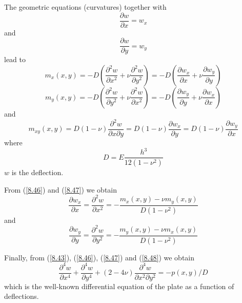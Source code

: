 The geometric equations (curvatures) together with
\begin{equation}
\frac{\partial w}{\partial x} = w_x
\label{8.44}
\end{equation}
and
\begin{equation}
\frac{\partial w}{\partial y} = w_y
\label{8.45}
\end{equation}
lead to
\begin{equation}
m_x(x,y) = -D\left(\frac{\partial^2 w}{\partial x^2} + \nu\frac{\partial^2 w}{\partial y^2}\right) = -D\left(\frac{\partial w_x}{\partial x} + \nu\frac{\partial w_y}{\partial y}\right)
\label{8.46}
\end{equation}
\begin{equation}
m_y(x,y) = -D\left(\frac{\partial^2 w}{\partial y^2} + \nu\frac{\partial^2 w}{\partial x^2}\right) = -D\left(\frac{\partial w_y}{\partial y} + \nu\frac{\partial w_x}{\partial x}\right)
\label{8.47}
\end{equation}
and
\begin{equation}
m_{xy}(x,y) = D(1-\nu)\frac{\partial^2 w}{\partial x \partial y} = D(1-\nu)\frac{\partial w_x}{\partial y} = D(1-\nu)\frac{\partial w_y}{\partial x}
\label{8.48}
\end{equation}
where
\begin{equation}
D = E\frac{h^3}{12(1-\nu^2)}
\label{8.49}
\end{equation}
$w$ is the deflection.

From (\ref{8.46}) and (\ref{8.47}) we obtain
\begin{equation}
\frac{\partial w_x}{\partial x} = \frac{\partial^2 w}{\partial x^2} = -\frac{m_x(x,y) - \nu m_y(x,y)}{D(1-\nu^2)}
\label{8.50}
\end{equation}
and
\begin{equation}
\frac{\partial w_y}{\partial y} = \frac{\partial^2 w}{\partial y^2} = -\frac{m_y(x,y) - \nu m_x(x,y)}{D(1-\nu^2)}
\label{8.51}
\end{equation}

Finally, from (\ref{8.43}), (\ref{8.46}), (\ref{8.47}) and (\ref{8.48}) we obtain
\begin{equation}
\boxed{\frac{\partial^4 w}{\partial x^4} + \frac{\partial^4 w}{\partial y^4} + (2-4\nu)\frac{\partial^4 w}{\partial x^2 \partial y^2} = -p(x,y)/D}
\label{8.52}
\end{equation}
which is the well-known differential equation of the plate as a function of deflections.

